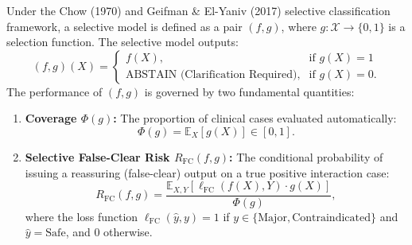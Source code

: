 \documentclass[11pt]{article}
\begin{document}
Under the Chow (1970) and Geifman \& El-Yaniv (2017) selective classification framework, a selective model is defined as a pair $(f, g)$, where $g: \mathcal{X} \to \{0, 1\}$ is a selection function. The selective model outputs:
\begin{equation}
(f, g)(X) = \begin{cases}
f(X), & \text{if } g(X) = 1 \\
\text{ABSTAIN (Clarification Required)}, & \text{if } g(X) = 0.
\end{cases}
\end{equation}
The performance of $(f, g)$ is governed by two fundamental quantities:
\begin{enumerate}
  \item \textbf{Coverage $\Phi(g)$:} The proportion of clinical cases evaluated automatically:
  \begin{equation}
  \Phi(g) = \mathbb{E}_{X}[g(X)] \in [0, 1].
  \end{equation}
  \item \textbf{Selective False-Clear Risk $R_{\text{FC}}(f, g)$:} The conditional probability of issuing a reassuring (false-clear) output on a true positive interaction case:
  \begin{equation}
  R_{\text{FC}}(f, g) = \frac{\mathbb{E}_{X, Y}[\ell_{\text{FC}}(f(X), Y) \cdot g(X)]}{\Phi(g)},
  \end{equation}
  where the loss function $\ell_{\text{FC}}(\hat{y}, y) = 1$ if $y \in \{\text{Major}, \text{Contraindicated}\}$ and $\hat{y} = \text{Safe}$, and $0$ otherwise.
\end{enumerate}
\end{document}
